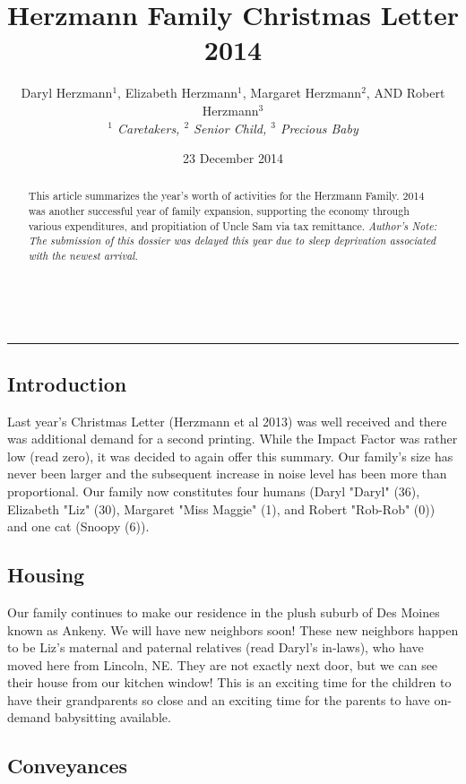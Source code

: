 \documentclass{article}
\title{Herzmann Family Christmas Letter 2014}
\author{Daryl Herzmann${}^1$, Elizabeth Herzmann${}^1$, Margaret 
Herzmann${}^2$, AND Robert Herzmann${}^3$ \\
\it{${}^1$ Caretakers},
\it{${}^2$ Senior Child},
\it{${}^3$ Precious Baby}}
\date{23 December 2014}
\newcommand{\Line}[0]{%
  \rule{0cm}{0cm}\\\hrule\rule{0cm}{0cm}%
}
\begin{document}
\maketitle

\begin{abstract}
This article summarizes the year's worth of activities for the Herzmann
Family.  2014 was another successful year of family expansion, 
supporting the economy through various expenditures, and propitiation of 
Uncle Sam via tax remittance.  \emph{Author's Note: The submission of this 
dossier was delayed this year due to sleep deprivation associated with the 
newest arrival.}

\end{abstract}

\Line

\begin{multicols}{2}

\section{Introduction} 

Last year's Christmas Letter (Herzmann et al 2013) was well received and 
there was additional demand for a second printing.  While the Impact 
Factor was rather low (read zero), it was decided to again offer this 
summary.  Our family's size has never been larger and the subsequent 
increase in noise level has been more than proportional.  Our family now 
constitutes four humans (Daryl "Daryl" (36), Elizabeth "Liz" (30), 
Margaret "Miss Maggie" (1), and Robert "Rob-Rob" (0)) and one cat (Snoopy 
(6)).

\subsection{Housing}

Our family continues to make our residence in the plush suburb of Des 
Moines known as Ankeny.  We will have new neighbors soon!  These new 
neighbors happen to be Liz's maternal and paternal relatives (read Daryl's 
in-laws), who have moved here from Lincoln, NE.  
They are not exactly next door, but we can see their house from 
our kitchen window!  This is an exciting time for the children to have 
their grandparents so close and an exciting time for the parents to have 
on-demand babysitting available.

\subsection{Conveyances}


\end{multicols}
\end{document}

